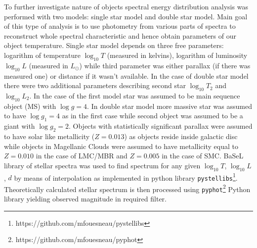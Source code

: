 \documentclass{pracalicmgr}
\begin{document}
To further investigate nature of objects spectral energy distribution analysis was 
performed with two models: single star model and double star model. Main goal of this type of analysis is to use photometry from various parts of spectra to
reconstruct whole spectral characteristic and hence obtain parameters of our object temperature.
Single star model depends on three free parameters: logarithm of temperature $\log_{10}T$ (measured in kelvins), logarithm of luminosity $\log_{10} L$ (measured in $L_{\odot}$) while third 
parameter was either parallax (if there was measured one) or distance if it wasn't available. In the case of double star model there were two additional parameters describing 
second star $\log_{10} T_2$ and $\log_{10} L_2$. In the case of the first model star was assumed to be main sequence object (MS) with $\log{g}=4$. In double star model more massive star 
was assumed to have $\log{g_1}=4$ as in the first case while second object was assumed to be a giant with $\log{g_2}=2$. Objects with statistically significant parallax were assumed to have 
solar like metallicity ($Z=0.013$) as objects reside inside galactic disc while objects in Magellanic Clouds 
were assumed to have metallicity equal to $Z=0.010$ in the case of LMC/MBR and $Z=0.005$ in the case of SMC.
BaSeL library of stellar spectra \citep{lejeune_standard_1998} was used to find spectrum for any given $\log_{10}{T}$, $\log_{10} L$, $d$ 
by means of interpolation as implemented in python library
\texttt{pystellibs}\footnote{https://github.com/mfouesneau/pystellibs}.
Theoretically calculated stellar spectrum is then processed using \texttt{pyphot}\footnote{https://github.com/mfouesneau/pyphot} 
Python library yielding observed magnitude in required filter.
\end{document}
